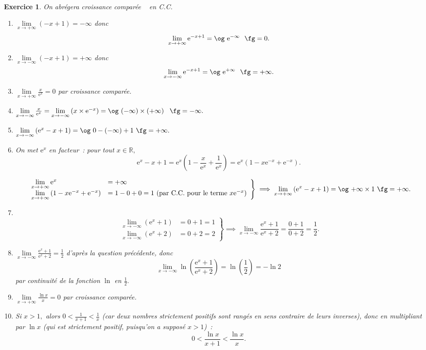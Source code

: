 \documentclass[10pt]{article}
\newtheorem{exo}{Exercice}
\begin{document}
\begin{exo}

On abrégera \og croissance comparée \fg~{} en C.C.

\begin{enumerate}
\item $\lim\limits_{x\to +\infty}(-x+1)=-\infty$ donc \[\lim\limits_{x\to +\infty}\text{e}^{-x+1}=\text{\og}~\text{e}^{-\infty}~\text{ \fg}=0.\]
\item$\lim\limits_{x\to -\infty}(-x+1)=+\infty$ donc \[\lim\limits_{x\to -\infty}\text{e}^{-x+1}=\text{\og}~\text{e}^{+\infty}~\text{ \fg}=+\infty.\]
\item $\lim\limits_{x\to +\infty}\frac{x}{\text{e}^x}=0$ par croissance comparée.
\item $\lim\limits_{x\to -\infty}\frac{x}{\text{e}^x}=\lim\limits_{x\to -\infty}\left(x\times \text{e}^{-x}\right)=\text{\og}~(-\infty)\times\left(+\infty\right)~\text{ \fg}=-\infty.$
\item $\lim\limits_{x\to -\infty}\left(\text{e}^x-x+1\right)=\text{\og}~0-(-\infty)+ 1~\text{\fg}=+\infty.$
\item  On met $\text{e}^{x}$ en facteur~: pour tout $x\in\mathbb{R},$
\[\text{e}^x-x+1=\text{e}^x\left(1-\frac{x}{\text{e}^x}+\frac{1}{\text{e}^x}\right)=
\text{e}^x\left(1-x\text{e}^{-x}+\text{e}^{-x}\right).\]

\[
\left.
    \begin{array}{ll}
        \lim\limits_{x\to +\infty}\text{e}^x&=  +\infty\\
        \lim\limits_{x\to +\infty}\left(1-x\text{e}^{-x}+\text{e}^{-x}\right) &= 1-0+0=1~\text{(par C.C. pour le terme }x\text{e}^{-x})
    \end{array}
\right \}\implies \lim\limits_{x\to +\infty}\left(\text{e}^x-x+1\right)=\text{\og}~{+\infty}\times 1~\text{\fg}=+\infty.
\]
\item ~{} \[
\left.
    \begin{array}{ll}
        \lim\limits_{x\to -\infty}\left(\text{e}^{x}+1\right)&= 0+1=1 \\
        \lim\limits_{x\to -\infty}\left(\text{e}^{x}+2\right)&= 0+2=2
    \end{array}
\right \}\implies \lim\limits_{x\to -\infty}\frac{\text{e}^{x}+1}{\text{e}^{x}+2}=\frac{0+1}{0+2}=\frac{1}{2}.
\]

\item $\lim\limits_{x\to -\infty}\frac{\text{e}^{x}+1}{\text{e}^{x}+2}=\frac{1}{2}$ d'après la question précédente, donc \[\lim\limits_{x\to -\infty}\ln\left(\frac{\text{e}^x+1}{\text{e}^x+2}\right)=\ln\left(\frac{1}{2}\right)=-\ln 2\] par continuité de la fonction $\ln$ en $\frac{1}{2}.$ 
\item $\lim\limits_{x\to +\infty}\frac{\ln x}{x}=0$ par croissance comparée.
\item Si $x>1,$ alors $0<\frac{1}{x+1}<\frac{1}{x}$ (car deux nombres strictement positifs sont rangés en sens contraire de leurs inverses), donc en multipliant par $\ln x$ (qui est strictement positif, puisqu'on a supposé $x>1$)~:
\[0<\frac{\ln x}{x+1}<\frac{\ln x}{x}.\]


\end{enumerate}
\end{exo}
\end{document}

